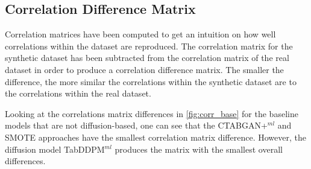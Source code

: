 \subsection{Correlation Difference Matrix}

Correlation matrices have been computed to get an intuition on how well correlations within the dataset are reproduced.
The correlation matrix for the synthetic dataset has been subtracted from the correlation matrix of the real dataset in order to produce a correlation difference matrix.
The smaller the difference, the more similar the correlations within the synthetic dataset are to the correlations within the real dataset.

Looking at the correlations matrix differences in \autoref{fig:corr_base} for the baseline models that are not diffusion-based, one can see that the CTABGAN+$^{ml}$ and SMOTE approaches have the smallest
correlation matrix difference.
However, the diffusion model TabDDPM$^{ml}$ produces the matrix with the smallest overall differences.


